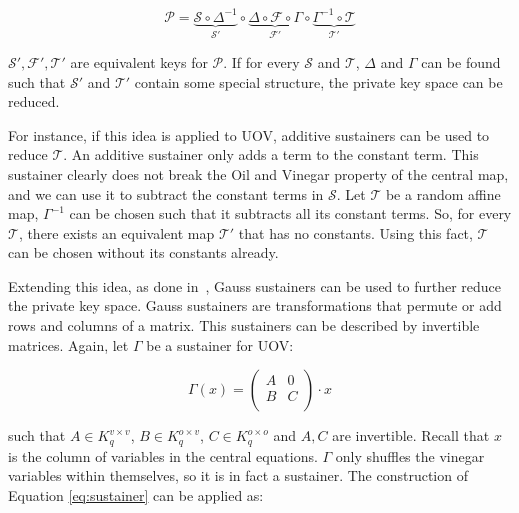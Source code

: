 \documentclass{ufsctex/ufsctex}
\begin{document}
\begin{equation}\label{eq:sustainer}
\mathcal{P} =
\underbrace{\mathcal{S} \circ \Delta^{-1}}_{\mathcal{S'}}
\circ
\underbrace{\Delta \circ \mathcal{F} \circ \Gamma}_{\mathcal{F'}}
\circ
\underbrace{\Gamma^{-1} \circ \mathcal{T}}_{\mathcal{T'}}
\end{equation}

$\mathcal{S'}, \mathcal{F'}, \mathcal{T'}$ are equivalent keys for
$\mathcal{P}$. If for every $\mathcal{S}$ and $\mathcal{T}$, $\Delta$ and
$\Gamma$ can be found such that $\mathcal{S'}$ and $\mathcal{T'}$ contain some
special structure, the private key space can be reduced.

For instance, if this idea is applied to UOV, additive sustainers can be used
to reduce $\mathcal{T}$. An additive sustainer only adds a term to the constant
term. This sustainer clearly does not break the Oil and Vinegar property of the
central map, and we can use it to subtract the constant terms in $\mathcal{S}$.
Let $\mathcal{T}$ be a random affine map, $\Gamma^{-1}$ can be chosen such that
it subtracts all its constant terms. So, for every $\mathcal{T}$, there exists
an equivalent map $\mathcal{T'}$ that has no constants. Using this fact,
$\mathcal{T}$ can be chosen without its constants already.

Extending this idea, as done in~\cite{wolf2011equivalent}, Gauss sustainers can
be used to further reduce the private key space. Gauss sustainers are
transformations that permute or add rows and columns of a matrix. This
sustainers can be described by invertible matrices. Again, let $\Gamma$ be a
sustainer for UOV:

\begin{equation}
\Gamma(x) =
\begin{pmatrix}
A & 0 \\
B & C \\
\end{pmatrix} \cdot x
\end{equation}

such that $A \in K^{v \times v}_q$, $B \in K^{o \times v}_q$, $C \in K^{o
\times o}_q$ and $A, C$ are invertible. Recall that $x$ is the column of
variables in the central equations. $\Gamma$ only shuffles the vinegar
variables within themselves, so it is in fact a sustainer. The construction of
Equation \ref{eq:sustainer} can be applied as:
\end{document}
